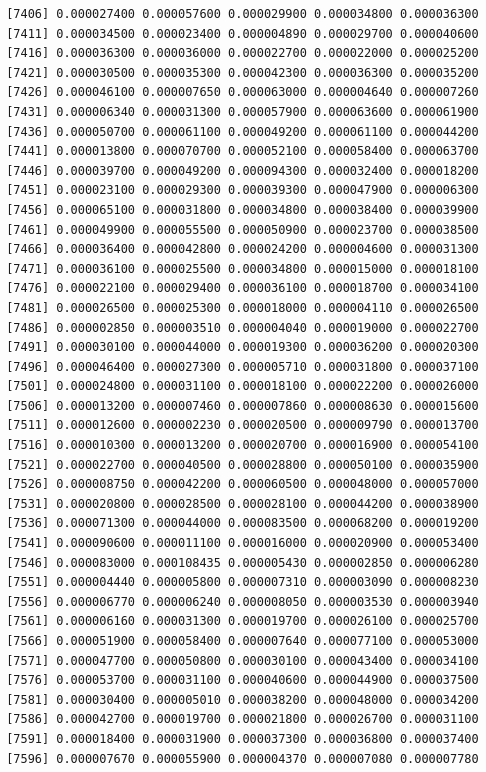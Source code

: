 \documentclass[]{article}
\begin{document}
\begin{verbatim}
 [7406] 0.000027400 0.000057600 0.000029900 0.000034800 0.000036300
 [7411] 0.000034500 0.000023400 0.000004890 0.000029700 0.000040600
 [7416] 0.000036300 0.000036000 0.000022700 0.000022000 0.000025200
 [7421] 0.000030500 0.000035300 0.000042300 0.000036300 0.000035200
 [7426] 0.000046100 0.000007650 0.000063000 0.000004640 0.000007260
 [7431] 0.000006340 0.000031300 0.000057900 0.000063600 0.000061900
 [7436] 0.000050700 0.000061100 0.000049200 0.000061100 0.000044200
 [7441] 0.000013800 0.000070700 0.000052100 0.000058400 0.000063700
 [7446] 0.000039700 0.000049200 0.000094300 0.000032400 0.000018200
 [7451] 0.000023100 0.000029300 0.000039300 0.000047900 0.000006300
 [7456] 0.000065100 0.000031800 0.000034800 0.000038400 0.000039900
 [7461] 0.000049900 0.000055500 0.000050900 0.000023700 0.000038500
 [7466] 0.000036400 0.000042800 0.000024200 0.000004600 0.000031300
 [7471] 0.000036100 0.000025500 0.000034800 0.000015000 0.000018100
 [7476] 0.000022100 0.000029400 0.000036100 0.000018700 0.000034100
 [7481] 0.000026500 0.000025300 0.000018000 0.000004110 0.000026500
 [7486] 0.000002850 0.000003510 0.000004040 0.000019000 0.000022700
 [7491] 0.000030100 0.000044000 0.000019300 0.000036200 0.000020300
 [7496] 0.000046400 0.000027300 0.000005710 0.000031800 0.000037100
 [7501] 0.000024800 0.000031100 0.000018100 0.000022200 0.000026000
 [7506] 0.000013200 0.000007460 0.000007860 0.000008630 0.000015600
 [7511] 0.000012600 0.000002230 0.000020500 0.000009790 0.000013700
 [7516] 0.000010300 0.000013200 0.000020700 0.000016900 0.000054100
 [7521] 0.000022700 0.000040500 0.000028800 0.000050100 0.000035900
 [7526] 0.000008750 0.000042200 0.000060500 0.000048000 0.000057000
 [7531] 0.000020800 0.000028500 0.000028100 0.000044200 0.000038900
 [7536] 0.000071300 0.000044000 0.000083500 0.000068200 0.000019200
 [7541] 0.000090600 0.000011100 0.000016000 0.000020900 0.000053400
 [7546] 0.000083000 0.000108435 0.000005430 0.000002850 0.000006280
 [7551] 0.000004440 0.000005800 0.000007310 0.000003090 0.000008230
 [7556] 0.000006770 0.000006240 0.000008050 0.000003530 0.000003940
 [7561] 0.000006160 0.000031300 0.000019700 0.000026100 0.000025700
 [7566] 0.000051900 0.000058400 0.000007640 0.000077100 0.000053000
 [7571] 0.000047700 0.000050800 0.000030100 0.000043400 0.000034100
 [7576] 0.000053700 0.000031100 0.000040600 0.000044900 0.000037500
 [7581] 0.000030400 0.000005010 0.000038200 0.000048000 0.000034200
 [7586] 0.000042700 0.000019700 0.000021800 0.000026700 0.000031100
 [7591] 0.000018400 0.000031900 0.000037300 0.000036800 0.000037400
 [7596] 0.000007670 0.000055900 0.000004370 0.000007080 0.000007780

\end{verbatim}
\end{document}

